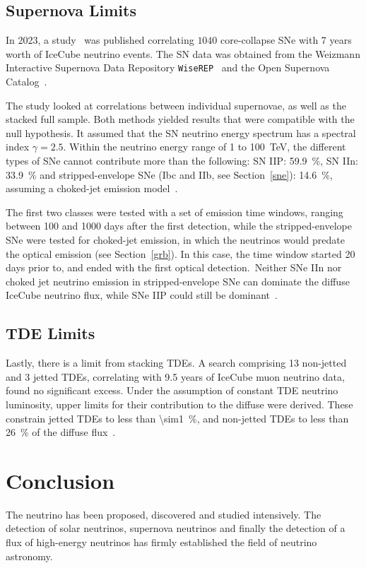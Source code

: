 \subsection{Supernova Limits}
In 2023, a study~ was published correlating $1040$ core-collapse SNe with 7 years worth of IceCube neutrino events. The SN data was obtained from the Weizmann Interactive Supernova Data Repository \texttt{WiseREP}~ and the Open Supernova Catalog~.

The study looked at correlations between individual supernovae, as well as the stacked full sample. Both methods yielded results that were compatible with the null hypothesis. It assumed that the SN neutrino energy spectrum has a spectral index $\gamma=2.5$. Within the neutrino energy range of 1 to \SI{100}{\tera\eV}, the different types of SNe cannot contribute more than the following: SN IIP: \SI{59.9}{\percent}, SN IIn: \SI{33.9}{\percent} and stripped-envelope SNe (Ibc and IIb, see Section~\ref{sne}): \SI{14.6}{\percent}, assuming a choked-jet emission model~\cite{Necker2023}.

The first two classes were tested with a set of emission time windows, ranging between 100 and 1000 days after the first detection, while the stripped-envelope SNe were tested for choked-jet emission, in which the neutrinos would predate the optical emission (see Section~\ref{grb}). In this case, the time window started 20 days prior to, and ended with the first optical detection.\ Neither SNe IIn nor choked jet neutrino emission in stripped-envelope SNe can dominate the diffuse IceCube neutrino flux, while SNe IIP could still be dominant~\cite{Necker2023}.

\subsection{TDE Limits}
Lastly, there is a limit from stacking TDEs. A search comprising 13 non-jetted and 3 jetted TDEs, correlating with 9.5 years of IceCube muon neutrino data, found no significant excess. Under the assumption of constant TDE neutrino luminosity, upper limits for their contribution to the diffuse were derived. These constrain jetted TDEs to less than \SI{\sim1}{\percent}, and non-jetted TDEs to less than \SI{26}{\percent} of the diffuse flux~.

\section{Conclusion}
The neutrino has been proposed, discovered and studied intensively. The detection of solar neutrinos, supernova neutrinos and finally the detection of a flux of high-energy neutrinos has firmly established the field of neutrino astronomy.

